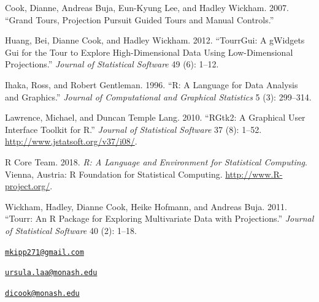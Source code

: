\leavevmode\hypertarget{ref-gt_pp_mc}{}%
Cook, Dianne, Andreas Buja, Eun-Kyung Lee, and Hadley Wickham. 2007.
``Grand Tours, Projection Pursuit Guided Tours and Manual Controls.''

\leavevmode\hypertarget{ref-tourrGui}{}%
Huang, Bei, Dianne Cook, and Hadley Wickham. 2012. ``TourrGui: A
gWidgets Gui for the Tour to Explore High-Dimensional Data Using
Low-Dimensional Projections.'' \emph{Journal of Statistical Software} 49
(6): 1--12.

\leavevmode\hypertarget{ref-ihaka:1996}{}%
Ihaka, Ross, and Robert Gentleman. 1996. ``R: A Language for Data
Analysis and Graphics.'' \emph{Journal of Computational and Graphical
Statistics} 5 (3): 299--314.

\leavevmode\hypertarget{ref-RGtk2}{}%
Lawrence, Michael, and Duncan Temple Lang. 2010. ``RGtk2: A Graphical
User Interface Toolkit for R.'' \emph{Journal of Statistical Software}
37 (8): 1--52. \url{http://www.jstatsoft.org/v37/i08/}.

\leavevmode\hypertarget{ref-R}{}%
R Core Team. 2018. \emph{R: A Language and Environment for Statistical
Computing}. Vienna, Austria: R Foundation for Statistical Computing.
\url{http://www.R-project.org/}.

\leavevmode\hypertarget{ref-tourr}{}%
Wickham, Hadley, Dianne Cook, Heike Hofmann, and Andreas Buja. 2011.
``Tourr: An R Package for Exploring Multivariate Data with
Projections.'' \emph{Journal of Statistical Software} 40 (2): 1--18.



\address{%
Michael Kipp\\
Monash University\\
Department of Econometrics and Business Statistics\\
}
\href{mailto:mkipp271@gmail.com}{\nolinkurl{mkipp271@gmail.com}}

\address{%
Ursula Laa\\
Monash University\\
School of Physics and Astronomy\\
}
\href{mailto:ursula.laa@monash.edu}{\nolinkurl{ursula.laa@monash.edu}}

\address{%
Dianne Cook\\
Monash University\\
Department of Econometrics and Business Statistics\\
}
\href{mailto:dicook@monash.edu}{\nolinkurl{dicook@monash.edu}}

